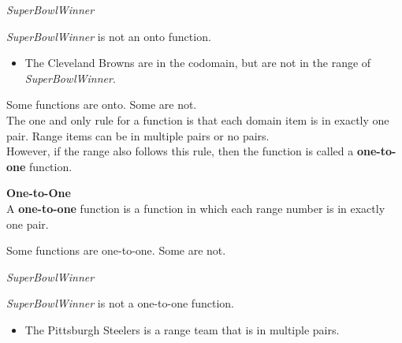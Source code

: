\documentclass{ximera}
\begin{document}
\begin{example} \textit{SuperBowlWinner}


\textit{SuperBowlWinner} is not an onto function.


\begin{itemize}
\item The Cleveland Browns are in the codomain, but are not in the range of \textit{SuperBowlWinner}.  
\end{itemize}

\end{example}







Some functions are onto. Some are not. \\




The one and only rule for a function is that each domain item is in exactly one pair.  Range items can be in multiple pairs or no pairs. \\

However, if the range also follows this rule, then the function is called a \textbf{one-to-one} function.



\begin{definition} \textbf{\textcolor{green!50!black}{One-to-One}} \\

A \textbf{one-to-one} function is a function in which each range number is in exactly one pair.

\end{definition}




Some functions are one-to-one. Some are not. \\














\begin{example} \textit{SuperBowlWinner}


\textit{SuperBowlWinner} is not a one-to-one function.


\begin{itemize}
\item The Pittsburgh Steelers is a range team that is in multiple pairs. 
\end{itemize}

\end{example}
\end{document}
